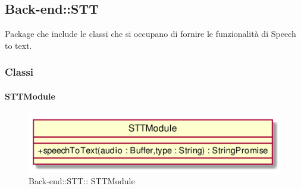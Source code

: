 \subsection{Back-end::STT}
Package che include le classi che si occupano di fornire le funzionalità di Speech to text.
\subsubsection{Classi}
\hypertarget{ STTModule_label}{\paragraph{ STTModule}}
\begin{figure}[h]
	\centering
	\includegraphics[width=\textwidth,height=\textheight,keepaspectratio]{images/Class_STTModule.png}
	\caption{Back-end::STT:: STTModule}
\end{figure}
